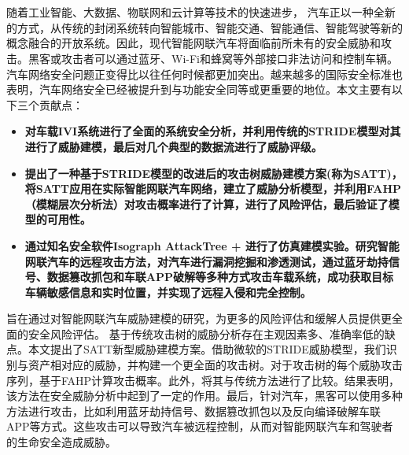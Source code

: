 \vspace{-2.5cm}
\chapter*{\xiaosan {}}
\hspace{-0.5cm}

随着工业智能、大数据、物联网和云计算等技术的快速进步，
汽车正以一种全新的方式，从传统的封闭系统转向智能城市、智能交通、智能通信、智能驾驶等新的概念融合的开放系统。因此，现代智能网联汽车将面临前所未有的安全威胁和攻击。黑客或攻击者可以通过蓝牙、Wi-Fi和蜂窝等外部接口非法访问和控制车辆。汽车网络安全问题正变得比以往任何时候都更加突出。越来越多的国际安全标准也表明，汽车网络安全已经被提升到与功能安全同等或更重要的地位。本文主要有以下三个贡献点：
\begin{itemize}
    \item \textbf{对车载IVI系统进行了全面的系统安全分析，并利用传统的STRIDE模型对其进行了威胁建模，最后对几个典型的数据流进行了威胁评级。}
    \item \textbf{提出了一种基于STRIDE模型的改进后的攻击树威胁建模方案(称为SATT)，将SATT应用在实际智能网联汽车网络，建立了威胁分析模型，并利用FAHP（模糊层次分析法）对攻击概率进行了计算，进行了风险评估，最后验证了模型的可用性。}
    \item \textbf{通过知名安全软件Isograph AttackTree + 进行了仿真建模实验。研究智能网联汽车的远程攻击方法，对汽车进行漏洞挖掘和渗透测试，通过蓝牙劫持信号、数据篡改抓包和车联APP破解等多种方式攻击车载系统，成功获取目标车辆敏感信息和实时位置，并实现了远程入侵和完全控制。}    
\end{itemize}

旨在通过对智能网联汽车威胁建模的研究，为更多的风险评估和缓解人员提供更全面的安全风险评估。
基于传统攻击树的威胁分析存在主观因素多、准确率低的缺点。本文提出了SATT新型威胁建模方案。借助微软的STRIDE威胁模型，我们识别与资产相对应的威胁，并构建一个更全面的攻击树。对于攻击树的每个威胁攻击序列，基于FAHP计算攻击概率。此外，将其与传统方法进行了比较。结果表明，该方法在安全威胁分析中起到了一定的作用。最后，针对汽车，黑客可以使用多种方法进行攻击，比如利用蓝牙劫持信号、数据篡改抓包以及反向编译破解车联APP等方式。这些攻击可以导致汽车被远程控制，从而对智能网联汽车和驾驶者的生命安全造成威胁。
\newline
{} 